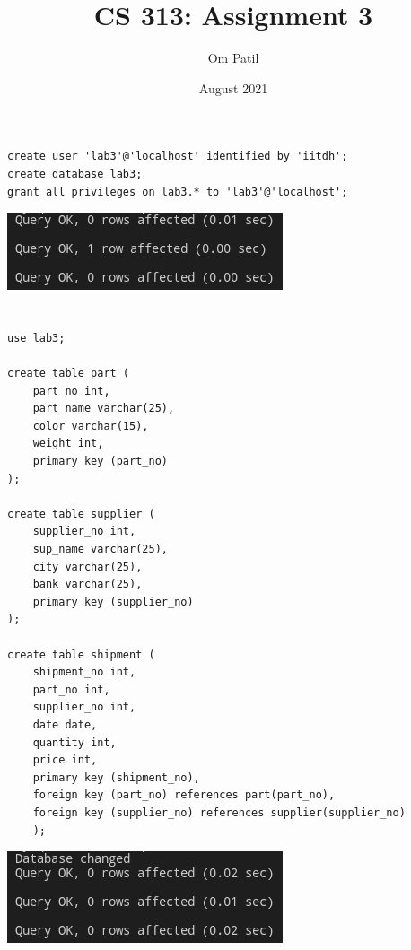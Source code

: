 \documentclass{article}
\title{CS 313: Assignment 3}
\author{Om Patil}
\date{August 2021}
\begin{document}
\maketitle

\section{}
\begin{lstlisting}
create user 'lab3'@'localhost' identified by 'iitdh';
create database lab3;
grant all privileges on lab3.* to 'lab3'@'localhost';
\end{lstlisting}
\begin{center}  
    \includegraphics[scale=0.6]{1.png}
\end{center}

\section{}
\begin{lstlisting}
use lab3;

create table part (
    part_no int,
    part_name varchar(25),
    color varchar(15),
    weight int,
    primary key (part_no)
);

create table supplier (
    supplier_no int,
    sup_name varchar(25),
    city varchar(25),
    bank varchar(25),
    primary key (supplier_no)
);

create table shipment (
    shipment_no int,
    part_no int,
    supplier_no int,
    date date,
    quantity int,
    price int,
    primary key (shipment_no),
    foreign key (part_no) references part(part_no),
    foreign key (supplier_no) references supplier(supplier_no)
    );
\end{lstlisting}
\begin{center}
    \includegraphics[scale=0.6]{2.png}
\end{center}
\end{document}
